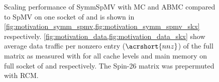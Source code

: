 \begin{figure}[t]
  	\caption{Scaling performance of \acrshort{SymmSpMV} with \acrshort{MC} and \acrshort{ABMC} compared to \acrshort{SpMV} on one socket of \IVB and \SKX is shown in \cref{fig:motivation_symm_spmv,fig:motivation_symm_spmv_skx} respectively. \cref{fig:motivation_data,fig:motivation_data_skx} show average data traffic per nonzero entry ($\acrshort{nnz}$) of the full matrix as measured with \LIKWID for all cache levels and main memory on full socket of \IVB and \SKX respectively. The Spin-26 matrix was prepermuted with \acrshort{RCM}.  }
  	\label{fig:motivation}
  \end{figure}
 
